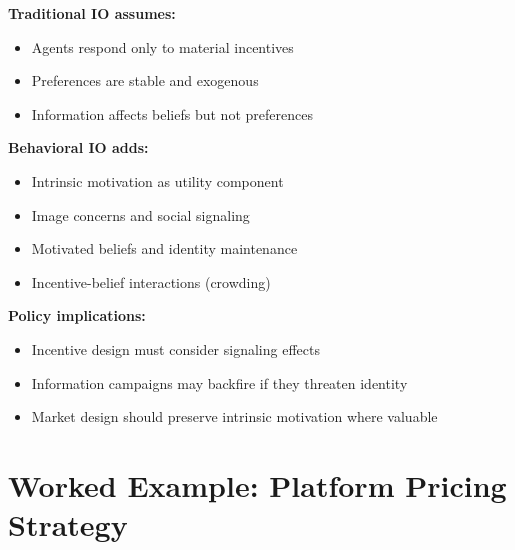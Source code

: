 \begin{tcolorbox}[colback=green!5!white,colframe=green!75!black,title=Behavioral IO: The Bénabou-Tirole Program]
\textbf{Traditional IO assumes:}
\begin{itemize}
    \item Agents respond only to material incentives
    \item Preferences are stable and exogenous
    \item Information affects beliefs but not preferences
\end{itemize}

\textbf{Behavioral IO adds:}
\begin{itemize}
    \item Intrinsic motivation as utility component
    \item Image concerns and social signaling
    \item Motivated beliefs and identity maintenance
    \item Incentive-belief interactions (crowding)
\end{itemize}

\textbf{Policy implications:}
\begin{itemize}
    \item Incentive design must consider signaling effects
    \item Information campaigns may backfire if they threaten identity
    \item Market design should preserve intrinsic motivation where valuable
\end{itemize}
\end{tcolorbox}

\section{Worked Example: Platform Pricing Strategy}
\label{sec:jt-example}

